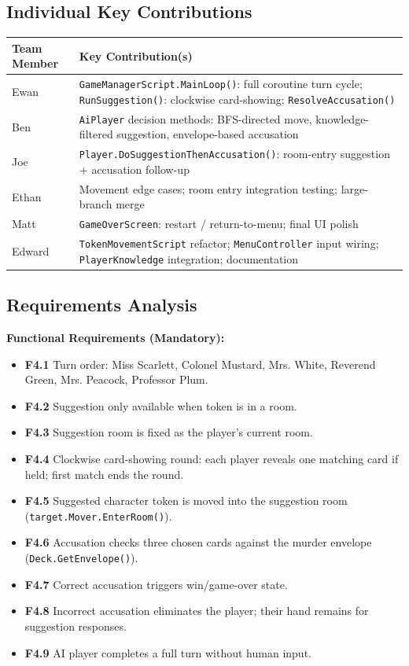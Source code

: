 \subsection*{Individual Key Contributions}
\begin{table}[H]
\centering
\footnotesize
\begin{tabular}{|p{1.8cm}|p{7.2cm}|}
\hline
\textbf{Team Member} & \textbf{Key Contribution(s)} \\ \hline
Ewan & \texttt{GameManagerScript.MainLoop()}: full coroutine turn cycle; \texttt{RunSuggestion()}: clockwise card-showing; \texttt{ResolveAccusation()} \\ \hline
Ben & \texttt{AiPlayer} decision methods: BFS-directed move, knowledge-filtered suggestion, envelope-based accusation \\ \hline
Joe & \texttt{Player.DoSuggestionThenAccusation()}: room-entry suggestion + accusation follow-up \\ \hline
Ethan & Movement edge cases; room entry integration testing; large-branch merge \\ \hline
Matt & \texttt{GameOverScreen}: restart / return-to-menu; final UI polish \\ \hline
Edward & \texttt{TokenMovementScript} refactor; \texttt{MenuController} input wiring; \texttt{PlayerKnowledge} integration; documentation \\ \hline
\end{tabular}
\end{table}

\subsection*{Requirements Analysis}

\textbf{Functional Requirements (Mandatory):}
\begin{itemize}
    \item \textbf{F4.1} Turn order: Miss Scarlett, Colonel Mustard, Mrs. White, Reverend Green, Mrs. Peacock, Professor Plum.
    \item \textbf{F4.2} Suggestion only available when token is in a room.
    \item \textbf{F4.3} Suggestion room is fixed as the player's current room.
    \item \textbf{F4.4} Clockwise card-showing round: each player reveals one matching card if held; first match ends the round.
    \item \textbf{F4.5} Suggested character token is moved into the suggestion room (\texttt{target.Mover.EnterRoom()}).
    \item \textbf{F4.6} Accusation checks three chosen cards against the murder envelope (\texttt{Deck.GetEnvelope()}).
    \item \textbf{F4.7} Correct accusation triggers win/game-over state.
    \item \textbf{F4.8} Incorrect accusation eliminates the player; their hand remains for suggestion responses.
    \item \textbf{F4.9} AI player completes a full turn without human input.
\end{itemize}

